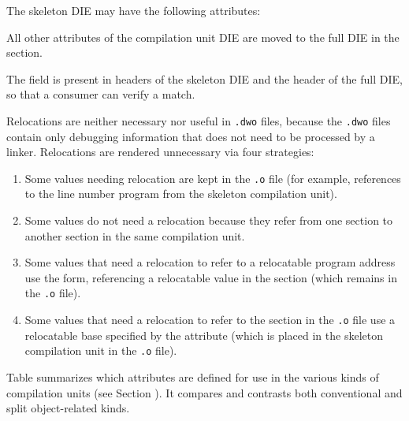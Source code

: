 The skeleton \DWTAGcompileunit{} DIE 
may have the following attributes:

All other attributes of the compilation unit DIE are moved to
the full DIE in the \dotdebuginfodwo{} section.

The \HFNdwoid{} field is present in headers of the skeleton DIE 
and the header of the full DIE, so that a consumer
can verify a match.

Relocations are neither necessary nor useful in 
\texttt{.dwo} files, because the \texttt{.dwo}  
files contain only debugging information that does not need to be
processed by a linker. Relocations are rendered unnecessary via
four strategies:

\begin{enumerate}[1. ]
\item Some values needing relocation are kept in the \texttt{.o} file
(for example, references to the line number program from the skeleton
compilation unit).

\item Some values do not need a relocation because they refer from
one \dotdwo{} section to another \dotdwo{} section
in the same compilation unit. 

\item Some values that need a relocation to refer to a
relocatable program address use the \DWFORMaddrx{} form,
referencing a relocatable value in the \dotdebugaddr{} section (which
remains in the \texttt{.o} file).

\item Some values that need a relocation to refer to the
\dotdebugranges{} section in the \texttt{.o} file use a relocatable base
specified by the \DWATrangesbase{} attribute (which is placed in the
skeleton compilation unit in the \texttt{.o} file).

\end{enumerate}


Table  summarizes which
attributes are defined for use in the various 
kinds of compilation units (see Section ). 
It compares and contrasts both conventional and split object-related
kinds.

